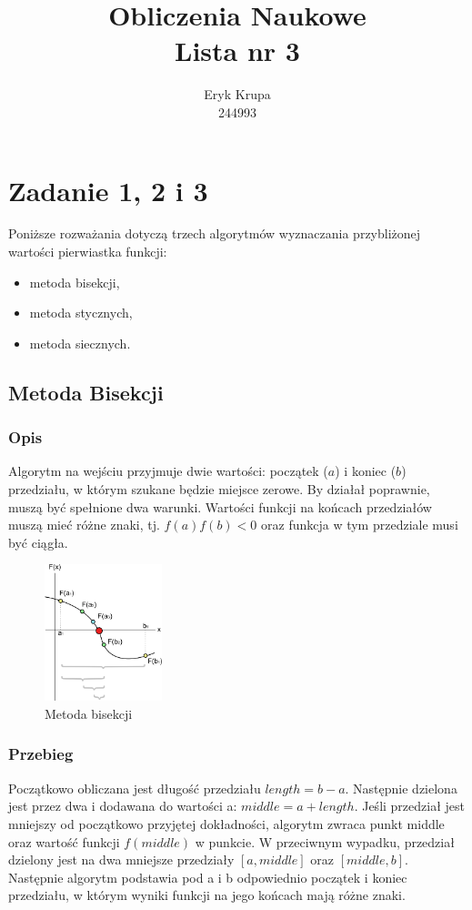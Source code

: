 \documentclass[12pt]{article}
\title{Obliczenia Naukowe \\ \large Lista nr 3}
\author{Eryk Krupa \\ 244993}
\date{}
\begin{document}
\renewcommand{\familydefault}{\sfdefault}
\maketitle
\newpage

\section{Zadanie 1, 2 i 3}
Poniższe rozważania dotyczą trzech algorytmów wyznaczania przybliżonej wartości pierwiastka funkcji:
\begin{itemize}
    \item metoda bisekcji,
    \item metoda stycznych,
    \item metoda siecznych.
\end{itemize}

\subsection{Metoda Bisekcji}
\subsubsection{Opis}
Algorytm na wejściu przyjmuje dwie wartości: początek ($a$) i koniec ($b$) przedziału, w którym szukane będzie miejsce zerowe. By działał poprawnie, muszą być spełnione dwa warunki. Wartości funkcji na końcach przedziałów muszą mieć różne znaki, tj. $f(a)f(b)<0$ oraz funkcja w tym przedziale musi być ciągła.
\begin{figure}[!htbp]
    \centering
    \includegraphics[height=150px]{bisection_method.png}
    \caption{Metoda bisekcji}
    \label{fig:bisection}
\end{figure}
\subsubsection{Przebieg}
Początkowo obliczana jest długość przedziału $length=b-a$. Następnie dzielona jest przez dwa i dodawana do wartości a:  $middle=a+length$. Jeśli przedział jest mniejszy od początkowo przyjętej dokładności, algorytm zwraca punkt middle oraz wartość funkcji $f(middle)$ w punkcie. W przeciwnym wypadku, przedział dzielony jest na dwa mniejsze przedziały $[a, middle]$ oraz $[middle, b]$. Następnie algorytm podstawia pod a i b odpowiednio początek i koniec przedziału, w którym wyniki funkcji na jego końcach mają różne znaki.
\end{document}
